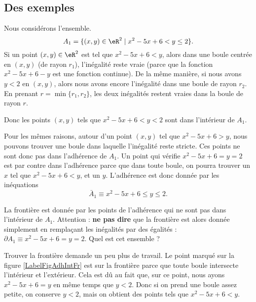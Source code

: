 \subsection{Des exemples}


\begin{example} \label{ItemExoEVN3i}
	Nous considérons l'ensemble.
	\begin{equation}
		A_1 = \{ (x, y ) \in \eR^2 \; | \; x^2 - 5x + 6 < y \leq 2 \}.
	\end{equation}
	Si un point \( (x,y)\in\eR^2\) est tel que \( x^2-5x+6<y\), alors dans une boule centrée en \( (x,y)\) (de rayon \( r_1\)), l'inégalité reste vraie (parce que la fonction \( x^2-5x+6-y\) est une fonction continue). De la même manière, si nous avons \( y<2\) en \( (x,y)\), alors nous avons encore l'inégalité dans une boule de rayon \( r_2\). En prenant \( r=\min\{ r_1,r_2 \}\), les deux inégalités restent vraies dans la boule de rayon \( r\).

	Donc les points \( (x,y)\) tels que \( x^2 - 5x + 6 < y < 2\) sont dans l'intérieur de \( A_1\).

	Pour les mêmes raisons, autour d'un point \( (x,y)\) tel que \( x^2-5x+6>y\), nous pouvons trouver une boule dans laquelle l'inégalité reste stricte. Ces points ne sont donc pas dans l'adhérence de \( A_1\). Un point qui vérifie \( x^2-5x+6= y= 2\) est par contre dans l'adhérence parce que dans toute boule, on pourra trouver un \( x\) tel que \( x^2-5x+6<y\), et un \( y\). L'adhérence est donc donnée par les inéquations
	\begin{equation}
		\bar A_1\equiv x^2-5x+6\leq y\leq 2.
	\end{equation}

	La frontière est donnée par les points de l'adhérence qui ne sont pas dans l'intérieur de \( A_1\). Attention : {\bf ne pas dire} que la frontière est alors donnée simplement en remplaçant les inégalités par des égalités : \( \partial A_1\equiv x^2-5x+6= y= 2\). Quel est cet ensemble ?

	Trouver la frontière demande un peu plus de travail. Le point marqué sur la figure \ref{LabelFigAdhIntFr} est sur la frontière parce que toute boule intersecte l'intérieur et l'extérieur. Cela est dû au fait que, sur ce point, nous ayons \( x^2-5x+6=y\) en même temps que \( y<2\). Donc si on prend une boule assez petite, on conserve \( y<2\), mais on obtient des points tels que \( x^2-5x+6<y\).


\end{example}
